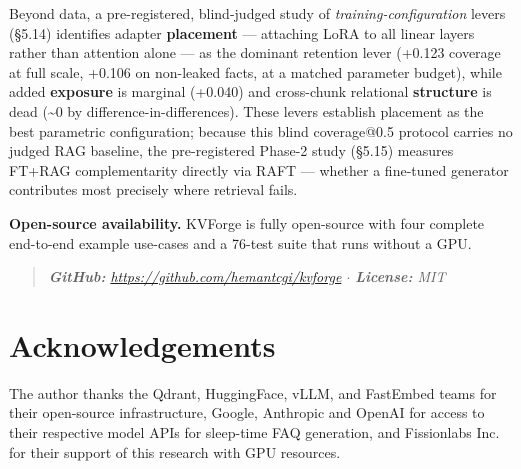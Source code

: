 \documentclass[10pt,twocolumn]{article}
\begin{document}
Beyond data, a pre-registered, blind-judged study of \textit{training-configuration} levers (\S{}5.14) identifies adapter \textbf{placement} --- attaching LoRA to all linear layers rather than attention alone --- as the dominant retention lever (+0.123 coverage at full scale, +0.106 on non-leaked facts, at a matched parameter budget), while added \textbf{exposure} is marginal (+0.040) and cross-chunk relational \textbf{structure} is dead (\textasciitilde{}0 by difference-in-differences). These levers establish placement as the best parametric configuration; because this blind coverage@0.5 protocol carries no judged RAG baseline, the pre-registered Phase-2 study (\S{}5.15) measures FT+RAG complementarity directly via RAFT --- whether a fine-tuned generator contributes most precisely where retrieval fails.


\textbf{Open-source availability.} KVForge is fully open-source with four complete end-to-end example use-cases and a 76-test suite that runs without a GPU.


\begin{quote}
\textit{\textbf{GitHub:} \href{https://github.com/hemantcgi/kvforge}{https://github.com/hemantcgi/kvforge} $\cdot$ \textbf{License:} MIT}
\end{quote}



\smallskip

\section*{Acknowledgements}

The author thanks the Qdrant, HuggingFace, vLLM, and FastEmbed teams for their open-source infrastructure, Google, Anthropic and OpenAI for access to their respective model APIs for sleep-time FAQ generation, and Fissionlabs Inc. for their support of this research with GPU resources.



\smallskip
\end{document}
